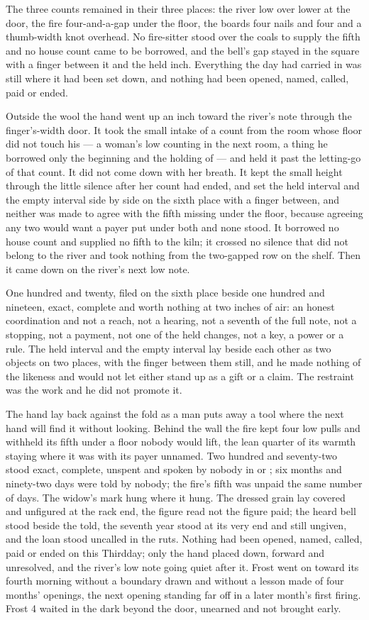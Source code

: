 The three counts remained in their three places: the river low over lower at the door, the fire four-and-a-gap under the floor, the boards four nails and four and a thumb-width knot overhead. No fire-sitter stood over the coals to supply the fifth and no house count came to be borrowed, and the bell's gap stayed in the square with a finger between it and the held inch. Everything the day had carried in was still where it had been set down, and nothing had been opened, named, called, paid or ended.

\scenebreak

Outside the wool the hand went up an inch toward the river's note through the finger's-width door. It took the small intake of a count from the room whose floor did not touch his --- a woman's low counting in the next room, a thing he borrowed only the beginning and the holding of --- and held it past the letting-go of that count. It did not come down with her breath. It kept the small height through the little silence after her count had ended, and set the held interval and the empty interval side by side on the sixth place with a finger between, and neither was made to agree with the fifth missing under the floor, because agreeing any two would want a payer put under both and none stood. It borrowed no house count and supplied no fifth to the kiln; it crossed no silence that did not belong to the river and took nothing from the two-gapped row on the shelf. Then it came down on the river's next low note.

One hundred and twenty, filed on the sixth place beside one hundred and nineteen, exact, complete and worth nothing at two inches of air: an honest coordination and not a reach, not a hearing, not a seventh of the full note, not a stopping, not a payment, not one of the held changes, not a key, a power or a rule. The held interval and the empty interval lay beside each other as two objects on two places, with the finger between them still, and he made nothing of the likeness and would not let either stand up as a gift or a claim. The restraint was the work and he did not promote it.

The hand lay back against the fold as a man puts away a tool where the next hand will find it without looking. Behind the wall the fire kept four low pulls and withheld its fifth under a floor nobody would lift, the lean quarter of its warmth staying where it was with its payer unnamed. Two hundred and seventy-two stood exact, complete, unspent and spoken by nobody in  or ; six months and ninety-two days were told by nobody; the fire's fifth was unpaid the same number of days. The widow's mark hung where it hung. The dressed grain lay covered and unfigured at the rack end, the figure read not the figure paid; the heard bell stood beside the told, the seventh year stood at its very end and still ungiven, and the loan stood uncalled in the ruts. Nothing had been opened, named, called, paid or ended on this Thirdday; only the hand placed down, forward and unresolved, and the river's low note going quiet after it. Frost went on toward its fourth morning without a boundary drawn and without a lesson made of four months' openings, the next opening standing far off in a later month's first firing. Frost 4 waited in the dark beyond the door, unearned and not brought early.
